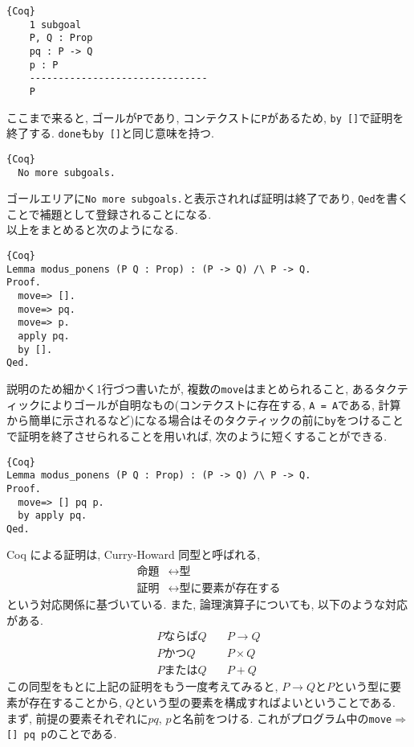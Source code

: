 \documentclass[11pt]{jsreport}
\theoremstyle{mystyle}
\newcommand{\ra}{\rightarrow}
\newcommand{\0}{\textbf{0}}
\newcommand{\1}{\textbf{1}}
\newcommand{\2}{\textbf{2}}
\begin{document}
\begin{screen}
  \begin{lstlisting}{Coq}
    1 subgoal
    P, Q : Prop
    pq : P -> Q
    p : P
    -------------------------------
    P \end{lstlisting}
\end{screen}
ここまで来ると, ゴールが{\tt P}であり, コンテクストに{\tt P}があるため, {\tt by []}で証明を終了する. {\tt done}も{\tt by []}と同じ意味を持つ.
\begin{screen}
  \begin{lstlisting}{Coq}
  No more subgoals. \end{lstlisting}
\end{screen}
ゴールエリアに{\tt No more subgoals.}と表示されれば証明は終了であり, {\tt Qed}を書くことで補題として登録されることになる. \\
以上をまとめると次のようになる. 
\begin{lstlisting}{Coq}
Lemma modus_ponens (P Q : Prop) : (P -> Q) /\ P -> Q.
Proof.
  move=> [].
  move=> pq.
  move=> p.
  apply pq.
  by [].
Qed. \end{lstlisting}
説明のため細かく1行づつ書いたが, 複数の{\tt move}はまとめられること, あるタクティックによりゴールが自明なもの(コンテクストに存在する, {\tt A = A}である, 計算から簡単に示されるなど)になる場合はそのタクティックの前に{\tt by}をつけることで証明を終了させられることを用いれば, 次のように短くすることができる. 
\begin{lstlisting}{Coq}
Lemma modus_ponens (P Q : Prop) : (P -> Q) /\ P -> Q.
Proof.
  move=> [] pq p.
  by apply pq.
Qed. \end{lstlisting}
Coq による証明は, Curry-Howard 同型と呼ばれる, 
\begin{align*}
  \text{命題} &\leftrightarrow \text{型} \\
  \text{証明} &\leftrightarrow \text{型に要素が存在する}
\end{align*}
という対応関係に基づいている. また, 論理演算子についても, 以下のような対応がある. 
\begin{align*}
  P \text{ならば} Q &\quad P \rightarrow Q \\
  P \text{かつ} Q &\quad P \times Q \\
  P \text{または} Q &\quad  P + Q
\end{align*}
この同型をもとに上記の証明をもう一度考えてみると, $P \ra Q$と$P$という型に要素が存在することから, $Q$という型の要素を構成すればよいということである. \\
まず, 前提の要素それぞれに$pq$, $p$と名前をつける. これがプログラム中の{\tt move$\Rightarrow$ [] pq p}のことである. 
\end{document}
